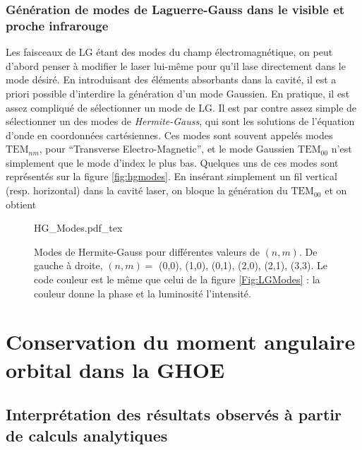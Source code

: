 \subsubsection{Génération de modes de Laguerre-Gauss dans le visible et proche infrarouge}
\label{sec:hg_modes}
Les faisceaux de LG étant des modes du champ électromagnétique, on peut d'abord penser à modifier le laser lui-même pour qu'il lase directement dans le mode désiré. En introduisant des éléments absorbants dans la cavité, il est a priori possible d'interdire la génération d'un mode Gaussien. En pratique, il est assez compliqué de sélectionner un mode de LG. Il est par contre assez simple de sélectionner un des modes de \textit{Hermite-Gauss}, qui sont les solutions de l'équation d'onde en coordonnées cartésiennes. Ces modes sont souvent appelés modes $\mbox{TEM}_{nm}$, pour ``Transverse Electro-Magnetic'', et le mode Gaussien $\mbox{TEM}_{00}$ n'est simplement que le mode d'index le plus bas. Quelques uns de ces modes sont représentés sur la figure \ref{fig:hgmodes}. En insérant simplement un fil vertical (resp. horizontal) dans la cavité laser, on bloque la génération du $\mbox{TEM}_{00}$ et on obtient 

\begin{figure}[!ht]
\centering
\def\svgwidth{\columnwidth}
{HG_Modes.pdf_tex}
\caption{Modes de Hermite-Gauss pour différentes valeurs de $(n,m)$. De gauche à droite, $(n,m) =$ (0,0), (1,0), (0,1), (2,0), (2,1), (3,3). Le code couleur est le même que celui de la figure \ref{Fig:LGModes} : la couleur donne la phase et la luminosité l'intensité.}
\label{Fig:hgmodes}
\end{figure}






















\section{Conservation du moment angulaire orbital dans la GHOE}
\subsection{Interprétation des résultats observés à partir de calculs analytiques}
